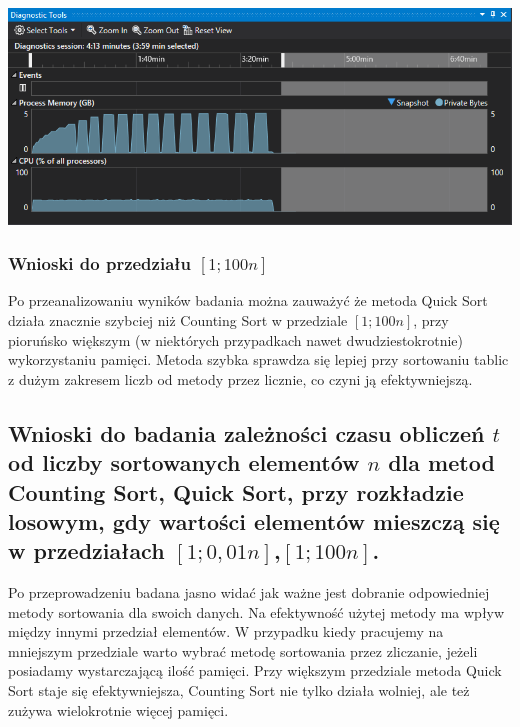 \documentclass[polish,polish,a4paper]{article}
\begin{document}
\begin{spacing}{1.5}
\begin{minipage}[H]{\textwidth}
	\begin{center}
		\includegraphics[scale=0.85]{zad4pamiec100n.png}
		\label{fig:zad4pamiec100n}
	\end{center}
\end{minipage}



\subsubsection{Wnioski do przedziału $[1;100n]$}

Po przeanalizowaniu wyników badania można zauważyć że metoda Quick Sort działa znacznie szybciej niż Counting Sort w przedziale $[1;100n]$, przy pioruńsko większym (w niektórych przypadkach nawet dwudziestokrotnie) wykorzystaniu pamięci. Metoda szybka sprawdza się lepiej przy sortowaniu tablic z dużym zakresem liczb od metody przez licznie, co czyni ją efektywniejszą.


\subsection{Wnioski do badania zależności czasu obliczeń $t$ od liczby sortowanych elementów $n$ dla metod Counting Sort, Quick Sort, przy rozkładzie losowym, gdy wartości elementów mieszczą się w przedziałach  $ [1;0,01n] $,$ [1;100n] $. }

Po przeprowadzeniu badana jasno widać jak ważne jest dobranie odpowiedniej metody sortowania dla swoich danych. Na efektywność użytej metody ma wpływ między innymi przedział elementów. W przypadku kiedy pracujemy na mniejszym przedziale warto wybrać metodę sortowania przez zliczanie, jeżeli posiadamy wystarczającą ilość pamięci. Przy większym przedziale metoda Quick Sort staje się efektywniejsza, Counting Sort nie tylko działa wolniej, ale też zużywa wielokrotnie więcej pamięci.
	

	
\end{spacing}
	\newpage
	\tableofcontents
\end{document}
